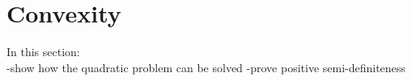 \section{Convexity}
\label{convexity}

In this section:
\\
-show how the quadratic problem can be solved
-prove positive semi-definiteness

